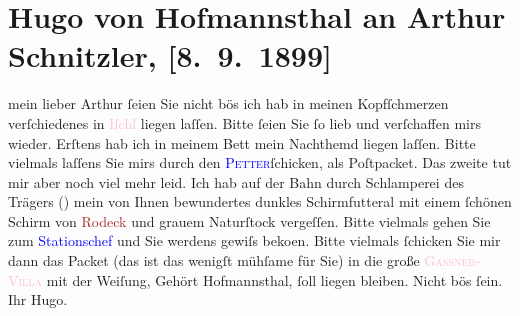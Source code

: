 

               \section[Hugo von Hofmannsthal an Arthur Schnitzler, {[}8. 9. 1899{]}]{ Hugo von Hofmannsthal an Arthur Schnitzler, {[}8. 9. 1899{]}}\nopagebreak{}\rehead{ }\normalsize\beginnumbering{} \toendnotes[C]{\smallbreak\pagebreak[2]} 
\toendnotes[C]{\smallbreak}\pstart{}{\pb}mein lieber Arthur\pend\pstart
           ſeien Sie nicht bös ich hab in meinen Kopfſchmerzen \label{K_L00969_1v}\label{K_L00969_1h} verſchiedenes in \textcolor{pink}{Iſchl}{}\ledrightnote{\textcolor{pink}{Bad Ischl}} liegen laſſen. Bitte ſeien Sie ſo lieb und
               verſchaffen mirs wieder. Erſtens hab ich in meinem Bett mein Nachthemd liegen laſſen.
               Bitte vielmals laſſens {\pb}Sie mirs
               durch den \textcolor{blue}{\textsc{Petter}}{}\ledrightnote{\textcolor{blue}{Leopold Petter}}{ }ſchicken, als Poſtpacket. Das zweite tut mir aber
               noch viel mehr leid. Ich hab auf der Bahn durch Schlamperei des Trägers () mein von Ihnen bewundertes dunkles Schirmfutteral mit einem {\pb}ſchönen Schirm von \textcolor{brown}{Rodeck}{}\ledrightnote{\textcolor{brown}{Gebrüder Rodeck}} und grauem Naturſtock vergeſſen. Bitte
               vielmals gehen Sie zum \textcolor{blue}{Stationschef}{} und Sie werdens gewiſs beko{\geminationm}en.
               Bitte vielmals ſchicken Sie mir dann das Packet (das ist das wenigſt mühſame für Sie)
                  {\pb}in die große \textcolor{pink}{\textsc{Gassner-Villa}}{}\ledrightnote{\textcolor{pink}{Villa Gassner}} mit der Weiſung, Gehört Hofmannsthal, ſoll liegen bleiben.\pend
           \pstart Nicht bös ſein. Ihr \spacefill\mbox{Hugo.}\pend{}\endnumbering{}  
      